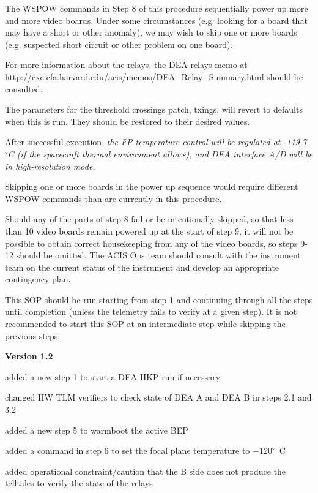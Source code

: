 \documentclass[11pt]{article}
\begin{document}
The WSPOW commands in Step 8 of this procedure sequentially power up more and more 
video boards. Under some circumstances (e.g. looking for a board that may have a 
short or other anomaly), we may wish to skip one or more boards (e.g. suspected 
short circuit or other problem on one board). 

For more information about the relays, the DEA relays memo at 
\url{http://cxc.cfa.harvard.edu/acis/memos/DEA_Relay_Summary.html} should be 
consulted.

The parameters for the threshold crossings patch, txings, will revert to defaults 
when this is run. They should be restored to their desired values.

After successful execution, {\em the FP temperature control will be regulated at 
-119.7~$^\circ$C (if the spacecraft thermal environment allows), and DEA interface 
A/D will be in high-resolution mode.}

Skipping one or more boards in the power up sequence would require different 
WSPOW commands than are currently in this procedure.

Should any of the parts of step 8 fail or be intentionally skipped, so that less 
than 10 video boards remain powered up at the start of step 9, it will not be 
possible to obtain correct housekeeping from any of the video boards, so steps 
9-12 should be omitted. The ACIS Ops team should consult with the instrument 
team on the current status of the instrument and develop an appropriate 
contingency plan.

This SOP should be run starting from step 1 and continuing through all the steps 
until completion (unless the telemetry fails to verify at a given step). It is 
not recommended to start this SOP at an intermediate step while skipping the previous steps.
\\

\newpage


\bd
\item {\bf Version 1.2}
\bi
\item added a new step 1 to start a DEA HKP run if necessary
\item changed HW TLM verifiers to check state of DEA A and DEA B in
steps 2.1 and 3.2
\item added a new step 5 to warmboot the active BEP
\item added a command in step 6 to set the focal plane temperature to
$-120^\circ$~C
\item added operational constraint/caution that the B side does not
produce the telltales to verify the state of the relays
\ei
\end{document}
